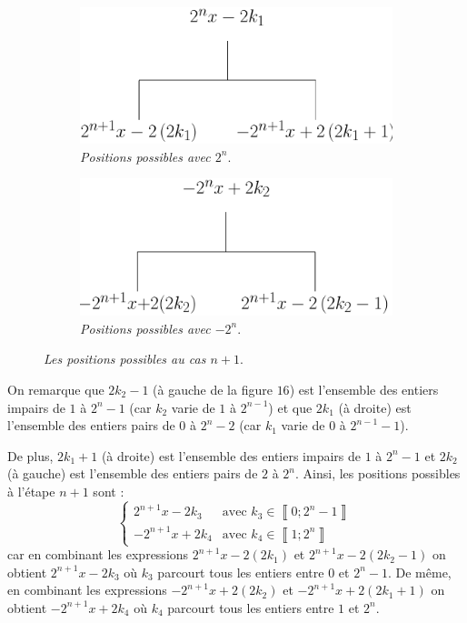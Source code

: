 \documentclass[a4paper,french,12pt]{article}
\begin{document}
{\begin{enumerate}
\begin{center}
\begin{figure}[H]
  \begin{subfigure}[b]{0.4\textwidth}
    \includegraphics[scale=0.45]{../TeXGraph/Pdf/visuel_2D_arbre_4_part_1.pdf}
    \caption{\emph{Positions possibles avec $2^n$}.}
    \label{fig:f3}
  \end{subfigure}
  \hfill
  \begin{subfigure}[b]{0.4\textwidth}
    \includegraphics[scale=0.45]{../TeXGraph/Pdf/visuel_2D_arbre_4_part_2.pdf}
    \caption{\emph{Positions possibles avec $-2^n$}.}
    \label{fig:f4}
  \end{subfigure}
  \caption{\emph{Les positions possibles au cas $n+1$}.}
\end{figure}
\end{center}
\vspace*{-1cm}

On remarque que $2k_2-1$ (à gauche de la figure $16$) est l'ensemble des entiers impairs de $1$ à $2^n-1$ (car $k_2$ varie de $1$ à $2^{n-1}$) et que $2k_1$ (à droite) est l'ensemble des entiers pairs de $0$ à $2^n-2$ (car $k_1$ varie de $0$ à $2^{n-1}-1$). 

De plus, $2k_1+1$ (à droite) est l'ensemble des entiers impairs de $1$ à $2^n-1$ et $2k_2$ (à gauche) est l'ensemble des entiers pairs de $2$ à $2^n$. Ainsi, les positions possibles à l'étape $n+1$ sont :
\[\begin{cases}2^{n+1}x-2k_3&\text{avec }k_3\in\left\llbracket0;2^n-1\right\rrbracket\\-2^{n+1}x+2k_4&\text{avec }k_4\in\left\llbracket1;2^n\right\rrbracket\end{cases}\]
car en combinant les expressions $2^{n+1}x-2\left(2k_1\right)$ et $2^{n+1}x-2\left(2k_2-1\right)$ on obtient $2^{n+1}x-2k_3$ où $k_3$ parcourt tous les entiers entre $0$ et $2^n-1$. De même, en combinant les expressions $-2^{n+1}x+2\left(2k_2\right)$ et $-2^{n+1}x+2\left(2k_1+1\right)$ on obtient $-2^{n+1}x+2k_4$ où $k_4$ parcourt tous les entiers entre $1$ et $2^n$.


\end{enumerate}}
\end{document}
